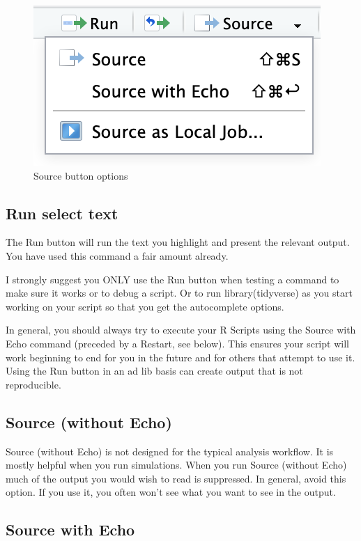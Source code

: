 \documentclass[
]{krantz}
\begin{document}
\begin{figure}
\includegraphics[width=0.35\linewidth]{ch_introduction/images/screenshot_source} \caption{Source button options}\label{fig:sourcebutton}
\end{figure}

\hypertarget{run-select-text}{%
\subsection{Run select text}\label{run-select-text}}

The Run button will run the text you highlight and present the relevant output. You have used this command a fair amount already.

I strongly suggest you ONLY use the Run button when testing a command to make sure it works or to debug a script. Or to run library(tidyverse) as you start working on your script so that you get the autocomplete options.

In general, you should always try to execute your R Scripts using the Source with Echo command (preceded by a Restart, see below). This ensures your script will work beginning to end for you in the future and for others that attempt to use it. Using the Run button in an ad lib basis can create output that is not reproducible.

\hypertarget{source-without-echo}{%
\subsection{Source (without Echo)}\label{source-without-echo}}

Source (without Echo) is not designed for the typical analysis workflow. It is mostly helpful when you run simulations. When you run Source (without Echo) much of the output you would wish to read is suppressed. In general, avoid this option. If you use it, you often won't see what you want to see in the output.

\hypertarget{source-with-echo}{%
\subsection{Source with Echo}\label{source-with-echo}}
\end{document}
